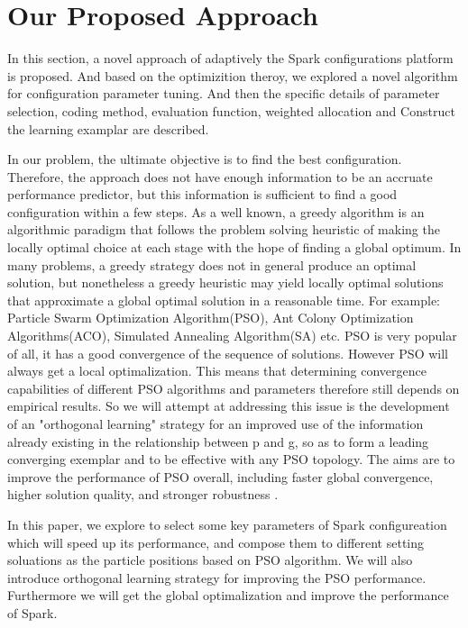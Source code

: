 \section{Our Proposed Approach}\label{sec:approach}
\par In this section, a novel approach of adaptively the Spark configurations platform is proposed. And based on the optimizition theroy, we explored a novel algorithm for configuration parameter tuning. And then the specific details of parameter selection, coding method, evaluation function, weighted allocation and Construct the learning examplar are described. 

\par In our problem, the ultimate objective is to find the best configuration. Therefore, the approach does not have enough information to be an accruate performance predictor, but this information is sufficient to find a good configuration within a few steps. As a well known, a greedy algorithm is an algorithmic paradigm that follows the problem solving heuristic of making the locally optimal choice at each stage \cite{greedy} with the hope of finding a global optimum. In many problems, a greedy strategy does not in general produce an optimal solution, but nonetheless a greedy heuristic may yield locally optimal solutions that approximate a global optimal solution in a reasonable time. For example: Particle Swarm Optimization Algorithm(PSO), Ant Colony Optimization Algorithms(ACO), Simulated Annealing Algorithm(SA) etc.  PSO is very popular of all, it has a good convergence of the sequence of solutions. However PSO will always get a local optimalization. This means that determining convergence capabilities of different PSO algorithms and parameters therefore still depends on empirical results. So we will attempt at addressing this issue is the development of an "orthogonal learning" strategy for an improved use of the information already existing in the relationship between p and g, so as to form a leading converging exemplar and to be effective with any PSO topology. The aims are to improve the performance of PSO overall, including faster global convergence, higher solution quality, and stronger robustness \cite{PSO2011}.
\par In this paper, we explore to select some key parameters of Spark configureation which will speed up its performance, and compose them to different setting soluations as the particle positions based on PSO algorithm.  We will also introduce orthogonal learning strategy for improving the PSO performance. Furthermore we will get the global optimalization and improve the performance of Spark.
